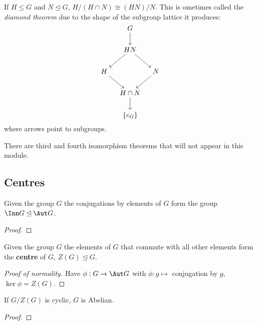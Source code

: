 \documentclass[../Year2.tex]{subfiles}
\begin{document}
\begin{theorem}\label{iso2}
    If $H\leq G$ and $N\unlhd G$, $H/(H\cap N)\cong (HN)/N$. This is ometimes called the \textit{diamond theorem} due to the shape of the subgroup lattice it produces: \[
        \begin{tikzcd}[cramped, column sep=small]
            & G \arrow[d]& \\
            & HN \arrow[ld] \arrow [rd]& \\
            H \arrow[rd] & & N \arrow[ld]\\
            & H\cap N \arrow[d]& \\
            & \{e_G\}& 
        \end{tikzcd}
    \] where arrows point to subgroups.
\end{theorem}

\begin{note}
    There are third and fourth isomorphism theorems that will not appear in this module.
\end{note}

\subsection{Centres}

\begin{definition}
    Given the group $G$ the conjugations by elements of $G$ form the group $\Inn G\unlhd\Aut G$.
    \begin{proof}
        
    \end{proof}
\end{definition}

\begin{definition}
    Given the group $G$ the elements of $G$ that commute with all other elements form the \textbf{centre} of $G$, $Z(G)\unlhd G$.
    \begin{proof}[Proof of normality]
        Have $\phi:G\rightarrow\Aut G$ with $\phi:g\mapsto$ conjugation by $g$, $\ker \phi = Z(G)$.
    \end{proof}
\end{definition}

\begin{theorem}
    If $G/Z(G)$ is cyclic, $G$ is Abelian.
    \begin{proof}
         
    \end{proof}
\end{theorem}
\end{document}
